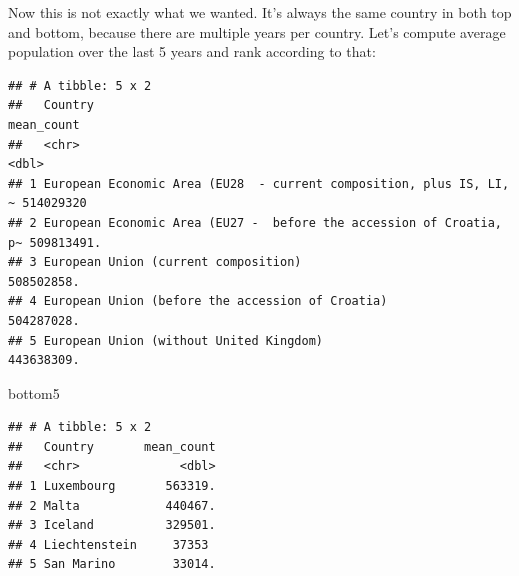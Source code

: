 \documentclass[]{book}
\newenvironment{Shaded}{\begin{snugshade}}{\end{snugshade}}
\newcommand{\KeywordTok}[1]{\textcolor[rgb]{0.13,0.29,0.53}{\textbf{#1}}}
\newcommand{\DataTypeTok}[1]{\textcolor[rgb]{0.13,0.29,0.53}{#1}}
\newcommand{\DecValTok}[1]{\textcolor[rgb]{0.00,0.00,0.81}{#1}}
\newcommand{\StringTok}[1]{\textcolor[rgb]{0.31,0.60,0.02}{#1}}
\newcommand{\OperatorTok}[1]{\textcolor[rgb]{0.81,0.36,0.00}{\textbf{#1}}}
\newcommand{\NormalTok}[1]{#1}
\begin{document}
Now this is not exactly what we wanted. It's always the same country in
both top and bottom, because there are multiple years per country. Let's
compute average population over the last 5 years and rank according to
that:

\begin{Shaded}
\end{Shaded}

\begin{verbatim}
## # A tibble: 5 x 2
##   Country                                                             mean_count
##   <chr>                                                                    <dbl>
## 1 European Economic Area (EU28  - current composition, plus IS, LI, ~ 514029320 
## 2 European Economic Area (EU27 -  before the accession of Croatia, p~ 509813491.
## 3 European Union (current composition)                                508502858.
## 4 European Union (before the accession of Croatia)                    504287028.
## 5 European Union (without United Kingdom)                             443638309.
\end{verbatim}

\begin{Shaded}
\begin{Highlighting}[]
\NormalTok{bottom5}
\end{Highlighting}
\end{Shaded}

\begin{verbatim}
## # A tibble: 5 x 2
##   Country       mean_count
##   <chr>              <dbl>
## 1 Luxembourg       563319.
## 2 Malta            440467.
## 3 Iceland          329501.
## 4 Liechtenstein     37353 
## 5 San Marino        33014.
\end{verbatim}
\end{document}
